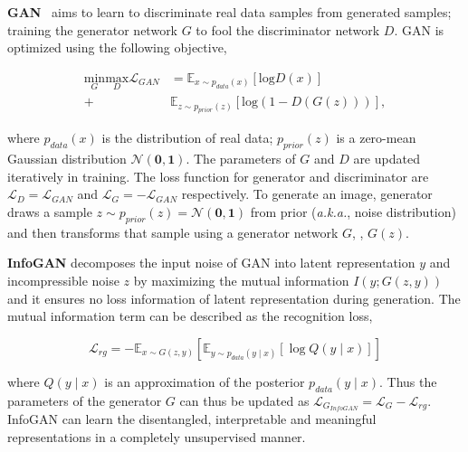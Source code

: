 \documentclass[10pt,letterpaper,twocolumn]{article}
\begin{document}
\noindent \textbf{GAN}~\cite{gan2014} aims to learn to discriminate
real data samples from generated samples; training the generator network
$G$ to fool the discriminator network $D$. GAN is optimized using
the following objective,

\begin{align}
\underset{G}{\mathrm{min}}\underset{D}{\mathrm{max}}\mathcal{L}_{GAN} & =\mathbb{E}_{x\sim p_{data}\left(x\right)}\left[\mathrm{log}D\left(x\right)\right]\label{eq:gan}\\
+ & \mathbb{E}_{z\sim p_{prior}\left(z\right)}\left[\mathrm{log}\left(1-D\left(G\left(z\right)\right)\right)\right],\nonumber 
\end{align}

\noindent where $p_{data}\left(x\right)$ is the distribution of real
data; $p_{prior}\left(z\right)$ is a zero-mean Gaussian distribution
$\mathcal{N}\left(\mathbf{0},\mathbf{1}\right)$. The parameters of
$G$ and $D$ are updated iteratively in training. The loss function
for generator and discriminator are $\mathcal{L}_{D}=\mathcal{L}_{GAN}$
and $\mathcal{L}_{G}=-\mathcal{L}_{GAN}$ respectively. To generate
an image, generator draws a sample $z\sim p_{prior}\left(z\right)=\mathcal{N}\left(\mathbf{0},\mathbf{1}\right)$
from prior ({\em a.k.a.}, noise distribution) and then transforms
that sample using a generator network $G$, \ie, $G(z)$.

\vspace{0.07in}
\noindent \textbf{InfoGAN} \cite{infogan} decomposes the input noise of GAN
into latent representation $y$ and incompressible noise $z$ by maximizing
the mutual information $I\left(y;G\left(z,y\right)\right)$ and it
ensures no loss information of latent representation during generation.
The mutual information term can be described as the recognition loss,

\noindent 
\[
\mathcal{L}_{rg}=-\mathbb{E}_{x\sim G\left(z,y\right)}\left[\mathbb{E}_{y\sim p_{data}\left(y\mid x\right)}\left[\log Q(y\mid x)\right]\right]
\]

\noindent where $Q\left(y\mid x\right)$ is an approximation of the
posterior $p_{data}\left(y\mid x\right)$. Thus the parameters of
the generator $G$ can thus be updated as $\mathcal{L}_{G_{InfoGAN}}=\mathcal{L}_{G}-\mathcal{L}_{rg}$.
InfoGAN can learn the disentangled, interpretable and meaningful representations
in a completely unsupervised manner.
\end{document}
